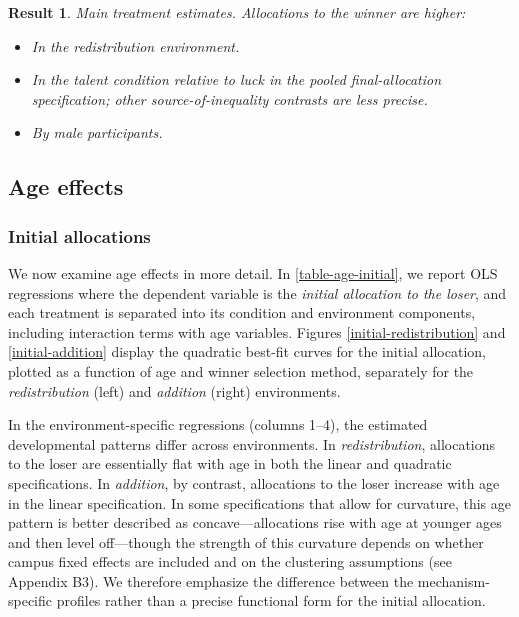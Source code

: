 \documentclass[11pt]{article}
\newtheorem{Result}{Result}
\begin{document}
\enlargethispage{2\baselineskip}
\begin{Result}\label{res-treatment} Main treatment estimates. Allocations to the winner are higher:
\begin{itemize}[noitemsep, topsep=0pt, parsep=0pt, partopsep=0pt]
\item[\textbf{a)}] In the redistribution environment.
\item[\textbf{b)}] In the talent condition relative to luck in the pooled final-allocation specification; other source-of-inequality contrasts are less precise.
\item[\textbf{c)}] By male participants.
\end{itemize}
\end{Result}



 
\subsection{Age effects \label{sec-age}}

\subsubsection{Initial allocations}

We now examine age effects in more detail. In \autoref{table-age-initial}, we report OLS regressions where the dependent variable is the \emph{initial allocation to the loser}, and each treatment is separated into its condition and environment components, including interaction terms with age variables.  Figures \ref{initial-redistribution} and \ref{initial-addition} display the quadratic best-fit curves for the initial allocation, plotted as a function of age and winner selection method, separately for the \emph{redistribution} (left) and \emph{addition} (right) environments. 

   

In the environment-specific regressions (columns 1--4), the estimated developmental patterns differ across environments. In \emph{redistribution}, allocations to the loser are essentially flat with age in both the linear and quadratic specifications. In \emph{addition}, by contrast, allocations to the loser increase with age in the linear specification. In some specifications that allow for curvature, this age pattern is better described as concave---allocations rise with age at younger ages and then level off---though the strength of this curvature depends on whether campus fixed effects are included and on the clustering assumptions (see Appendix B3). We therefore emphasize the difference between the mechanism-specific profiles rather than a precise functional form for the initial allocation.
\end{document}
